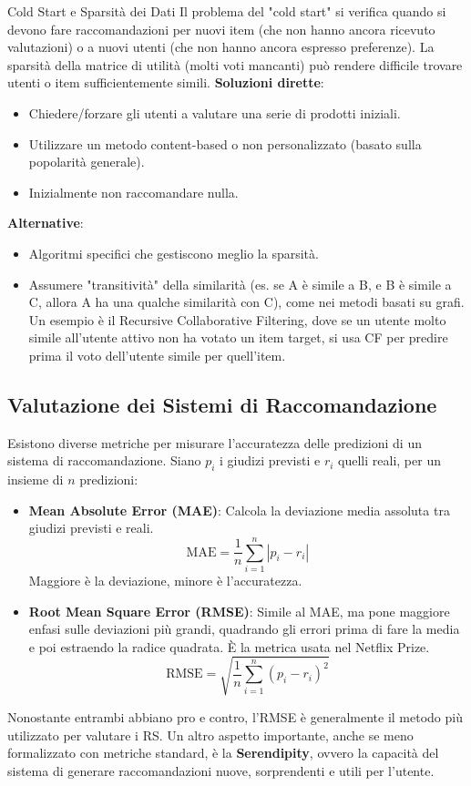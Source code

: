 \documentclass{article}
\begin{document}
\begin{definitionbox}{Cold Start e Sparsità dei Dati}
    Il problema del "cold start" si verifica quando si devono fare raccomandazioni per nuovi item (che non hanno ancora ricevuto valutazioni) o a nuovi utenti (che non hanno ancora espresso preferenze). La sparsità della matrice di utilità (molti voti mancanti) può rendere difficile trovare utenti o item sufficientemente simili.
    \textbf{Soluzioni dirette}:
    \begin{itemize}
        \item Chiedere/forzare gli utenti a valutare una serie di prodotti iniziali.
        \item Utilizzare un metodo content-based o non personalizzato (basato sulla popolarità generale).
        \item Inizialmente non raccomandare nulla.
    \end{itemize}
    \textbf{Alternative}:
    \begin{itemize}
        \item Algoritmi specifici che gestiscono meglio la sparsità.
        \item Assumere "transitività" della similarità (es. se A è simile a B, e B è simile a C, allora A ha una qualche similarità con C), come nei metodi basati su grafi. Un esempio è il Recursive Collaborative Filtering, dove se un utente molto simile all'utente attivo non ha votato un item target, si usa CF per predire prima il voto dell'utente simile per quell'item.
    \end{itemize}
\end{definitionbox}

\subsection{Valutazione dei Sistemi di Raccomandazione}
Esistono diverse metriche per misurare l'accuratezza delle predizioni di un sistema di raccomandazione. Siano $p_i$ i giudizi previsti e $r_i$ quelli reali, per un insieme di $n$ predizioni:

\begin{itemize}
    \item \textbf{Mean Absolute Error (MAE)}: Calcola la deviazione media assoluta tra giudizi previsti e reali.
          $$ \text{MAE} = \frac{1}{n} \sum_{i=1}^{n} |p_i - r_i| $$
          Maggiore è la deviazione, minore è l'accuratezza.
    \item \textbf{Root Mean Square Error (RMSE)}: Simile al MAE, ma pone maggiore enfasi sulle deviazioni più grandi, quadrando gli errori prima di fare la media e poi estraendo la radice quadrata. È la metrica usata nel Netflix Prize.
          $$ \text{RMSE} = \sqrt{\frac{1}{n} \sum_{i=1}^{n} (p_i - r_i)^2} $$
\end{itemize}
Nonostante entrambi abbiano pro e contro, l'RMSE è generalmente il metodo più utilizzato per valutare i RS. Un altro aspetto importante, anche se meno formalizzato con metriche standard, è la \textbf{Serendipity}, ovvero la capacità del sistema di generare raccomandazioni nuove, sorprendenti e utili per l'utente.
\end{document}
